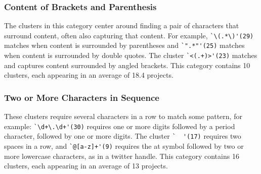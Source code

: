 
\subsubsection{Content of Brackets and Parenthesis}
\label{cluster:contentparens}
The clusters in this category center around finding a pair of characters that surround content, often also capturing that content. For example,
\verb!`\(.*\)'(29)! matches when content is surrounded by parentheses and \verb!`".*"'(25)! matches  when content is surrounded by double quotes.  The cluster \verb!`<(.+)>'(23)! matches and captures content surrounded by angled brackets.
This category contains 10 clusters, each appearing in an average of 18.4 projects. 
\subsubsection{Two or More Characters in Sequence}
\label{cluster:multiple}
These clusters require several characters in a row to match some pattern, for example:
\verb!`\d+\.\d+'(30)! requires one or more digits followed by a period character, followed by one or more digits.  The cluster \verb!`  '(17)! requires two spaces in a row,
and \verb!`@[a-z]+'(9)! requires the at symbol followed by two or more lowercase characters, as in a twitter handle.
This category contains 16 clusters, each appearing in an average of 13 projects.  


